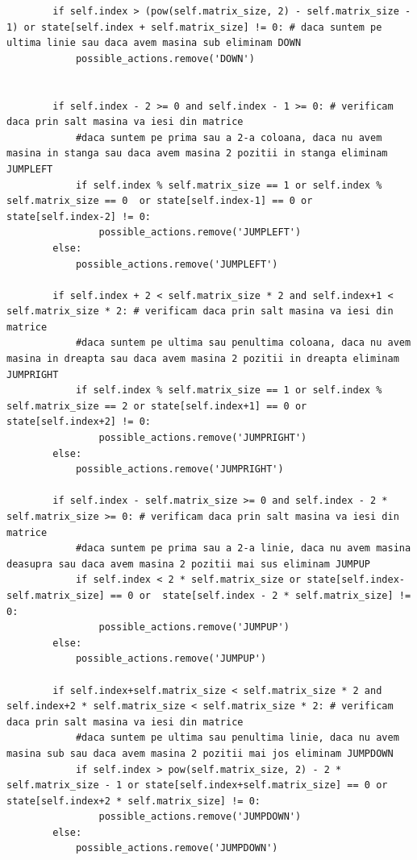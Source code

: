 \documentclass[14pt]{article}
\begin{document}
\begin{lstlisting}
        if self.index > (pow(self.matrix_size, 2) - self.matrix_size - 1) or state[self.index + self.matrix_size] != 0: # daca suntem pe ultima linie sau daca avem masina sub eliminam DOWN
            possible_actions.remove('DOWN')
        

        if self.index - 2 >= 0 and self.index - 1 >= 0: # verificam daca prin salt masina va iesi din matrice
            #daca suntem pe prima sau a 2-a coloana, daca nu avem masina in stanga sau daca avem masina 2 pozitii in stanga eliminam JUMPLEFT
            if self.index % self.matrix_size == 1 or self.index % self.matrix_size == 0  or state[self.index-1] == 0 or state[self.index-2] != 0:
                possible_actions.remove('JUMPLEFT')
        else:
            possible_actions.remove('JUMPLEFT')
        
        if self.index + 2 < self.matrix_size * 2 and self.index+1 < self.matrix_size * 2: # verificam daca prin salt masina va iesi din matrice
            #daca suntem pe ultima sau penultima coloana, daca nu avem masina in dreapta sau daca avem masina 2 pozitii in dreapta eliminam JUMPRIGHT
            if self.index % self.matrix_size == 1 or self.index % self.matrix_size == 2 or state[self.index+1] == 0 or state[self.index+2] != 0:
                possible_actions.remove('JUMPRIGHT')
        else:
            possible_actions.remove('JUMPRIGHT')
        
        if self.index - self.matrix_size >= 0 and self.index - 2 * self.matrix_size >= 0: # verificam daca prin salt masina va iesi din matrice
            #daca suntem pe prima sau a 2-a linie, daca nu avem masina deasupra sau daca avem masina 2 pozitii mai sus eliminam JUMPUP
            if self.index < 2 * self.matrix_size or state[self.index-self.matrix_size] == 0 or  state[self.index - 2 * self.matrix_size] != 0:
                possible_actions.remove('JUMPUP')
        else:
            possible_actions.remove('JUMPUP')

        if self.index+self.matrix_size < self.matrix_size * 2 and self.index+2 * self.matrix_size < self.matrix_size * 2: # verificam daca prin salt masina va iesi din matrice
            #daca suntem pe ultima sau penultima linie, daca nu avem masina sub sau daca avem masina 2 pozitii mai jos eliminam JUMPDOWN
            if self.index > pow(self.matrix_size, 2) - 2 * self.matrix_size - 1 or state[self.index+self.matrix_size] == 0 or  state[self.index+2 * self.matrix_size] != 0:
                possible_actions.remove('JUMPDOWN')
        else:
            possible_actions.remove('JUMPDOWN')
               

\end{lstlisting}
\end{document}
